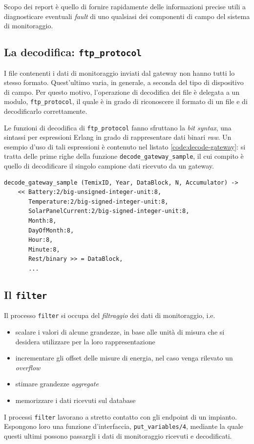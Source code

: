 %
Scopo dei report \`e quello di fornire rapidamente delle informazioni precise utili a diagnosticare 
eventuali \emph{fault} di uno qualsiasi dei componenti di campo del sistema di monitoraggio.
%

%
\subsection{La decodifica: \texttt{ftp\_protocol}}
%
I file contenenti i dati di monitoraggio inviati dal gateway non hanno tutti lo stesso formato.
%
Quest'ultimo varia, in generale, a seconda del tipo di dispositivo di campo. Per questo motivo, 
l'operazione di decodifica dei file \`e delegata a un modulo, \texttt{ftp\_protocol}, 
il quale \`e in grado di riconoscere il formato di un file e di decodificarlo 
correttamente.
%

%
Le funzioni di decodifica di \texttt{ftp\_protocol} fanno sfruttano la \emph{bit syntax}, una 
sintassi per espressioni Erlang in grado di rappresentare dati binari \emph{raw}.
%
Un esempio d'uso di tali espressioni \`e contenuto nel listato \ref{code:decode-gateway}: si tratta
delle prime righe della funzione \texttt{decode\_gateway\_sample}, il cui compito \`e quello di 
decodificare il singolo campione dati ricevuto da un gateway.
%
\begin{lstlisting}[caption={Decodifica di un blocco dati del Gateway}, label={code:decode-gateway},frame=trBL]
decode_gateway_sample (TemixID, Year, DataBlock, N, Accumulator) ->
    << Battery:2/big-unsigned-integer-unit:8,
       Temperature:2/big-signed-integer-unit:8,
       SolarPanelCurrent:2/big-signed-integer-unit:8,
       Month:8,
       DayOfMonth:8,
       Hour:8,
       Minute:8,
       Rest/binary >> = DataBlock,
       ...
\end{lstlisting}
%

%
\subsection{Il \texttt{filter}}
Il processo \texttt{filter} si occupa del \emph{filtraggio} dei dati di monitoraggio, i.e.
\begin{itemize}
\item scalare i valori di alcune grandezze, in base alle unit\`a di misura che si desidera
      utilizzare per la loro rappresentazione
%
\item incrementare gli offset delle misure di energia, nel caso venga rilevato un \emph{overflow}
%
\item stimare grandezze \emph{aggregate}
%
\item memorizzare i dati ricevuti sul database
%
\end{itemize}
%
I processi \texttt{filter} lavorano a stretto contatto con gli endpoint di un impianto. 
%
Espongono loro una funzione d'interfaccia, \texttt{put\_variables/4}, mediante la quale 
questi ultimi possono passargli i dati di monitoraggio ricevuti e decodificati.
%

